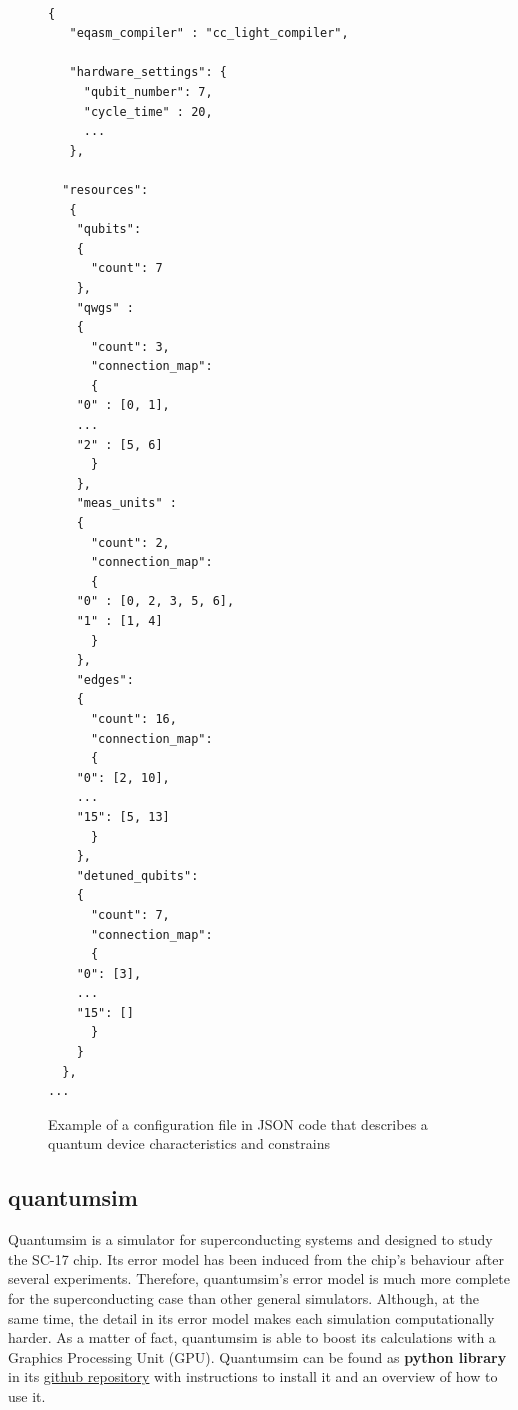 \begin{figure}
\centering

\begin{verbatim}

{
   "eqasm_compiler" : "cc_light_compiler",

   "hardware_settings": {
	 "qubit_number": 7,
	 "cycle_time" : 20,  
     ...
   },

  "resources":
   {
    "qubits":
    {
      "count": 7
    },
    "qwgs" :
    {
      "count": 3,
      "connection_map":
      {
	"0" : [0, 1],
	...
	"2" : [5, 6]
      }
    },
    "meas_units" :
    {
      "count": 2,
      "connection_map":
      {
	"0" : [0, 2, 3, 5, 6],
	"1" : [1, 4]
      }
    },
    "edges":
    {  
      "count": 16,
      "connection_map":
      {
	"0": [2, 10], 
	...
	"15": [5, 13]
      }
    },
    "detuned_qubits":
    {     
      "count": 7,
      "connection_map":
      {
	"0": [3],
	...
	"15": []
      }
    }
  },
...

\end{verbatim}



\caption{Example of a configuration file in JSON code that describes a quantum device characteristics and constrains}
\label{code:json_sc7}
\end{figure}

\subsection*{quantumsim}
\label{sec:orged37996}

Quantumsim \cite{O_Brien_2017} is a simulator for superconducting systems and designed to study the SC-17 chip.
Its error model has been induced from the chip's behaviour after several experiments.
Therefore, quantumsim's error model is much more complete for the superconducting case than other general simulators.
Although, at the same time, the detail in its error model makes each simulation computationally harder.
As a matter of fact, quantumsim is able to boost its calculations with a Graphics Processing Unit (GPU).
Quantumsim can be found as \textbf{python library} in its \href{https://github.com/quantumsim/quantumsim}{github repository} with instructions to install it and an overview of how to use it.

